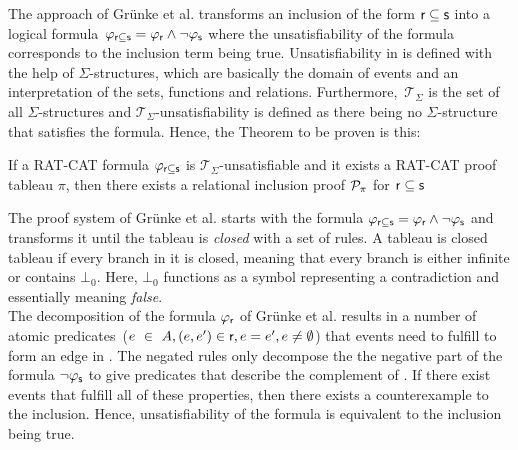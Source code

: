 \documentclass[a4paper,twoside,12pt, english]{article}
\begin{document}
\noindent The approach of Grünke et al. transforms an inclusion of the form $\textsf{\upshape r} \subseteq \textsf{\upshape s}$ into a logical formula~$\varphi_{\textsf{\upshape r} \subseteq \textsf{\upshape s}} = \varphi_{\textsf{\upshape r}} \land \neg \varphi_{\textsf{\upshape s}}$ where the unsatisfiability of the formula corresponds to the inclusion term being true. Unsatisfiability in \cite{Gru+26} is defined with the help of $\Sigma$-structures, which are basically the domain of events and an interpretation of the sets, functions and relations. Furthermore,~$\mathcal{T}_\Sigma$ is the set of all $\Sigma$-structures and $\mathcal{T}_\Sigma$-unsatisfiability is defined as there being no $\Sigma$-structure that satisfies the formula.
Hence, the Theorem to be proven is this:
\begin{theorem}\label{thm:satinc}
If a RAT-CAT formula $\varphi_{\textsf{\upshape r} \subseteq \textsf{\upshape s}}$ is $\mathcal{T}_\Sigma$-unsatisfiable and it exists a RAT-CAT proof tableau $\pi$, then there exists a relational inclusion proof $\mathcal{P}_\pi$ for $\sf r \subseteq s$
\end{theorem}




The proof system of Grünke et al. starts with the formula $\varphi_{\textsf{\upshape r} \subseteq \textsf{\upshape s}} = \varphi_{\textsf{\upshape r}} \land \neg \varphi_{\textsf{\upshape s}}$ and transforms it until the tableau is \textit{closed} with a set of rules. 
A tableau is closed tableau if every branch in it is closed, meaning that every branch is either infinite or contains $\bot_0$. Here, $\bot_0$ functions as a symbol representing a contradiction and essentially meaning \textit{false}. \\ 
The decomposition of the formula $\varphi_{\textsf{\upshape r}}$ of Grünke et al. \cite{Gru+26} results in a number of atomic predicates~($e~\in~A, (e,e') \in  \textsf{\upshape r}, e = e', e \neq \emptyset$) that events need to fulfill to form an edge in \relr. The negated rules only decompose the the negative part of the formula $\neg \varphi_{\textsf{\upshape s}}$ to give predicates that describe the complement of \rels. If there exist events that fulfill all of these properties, then there exists a counterexample to the inclusion.
Hence, unsatisfiability of the formula is equivalent to the inclusion being true. 
\end{document}
